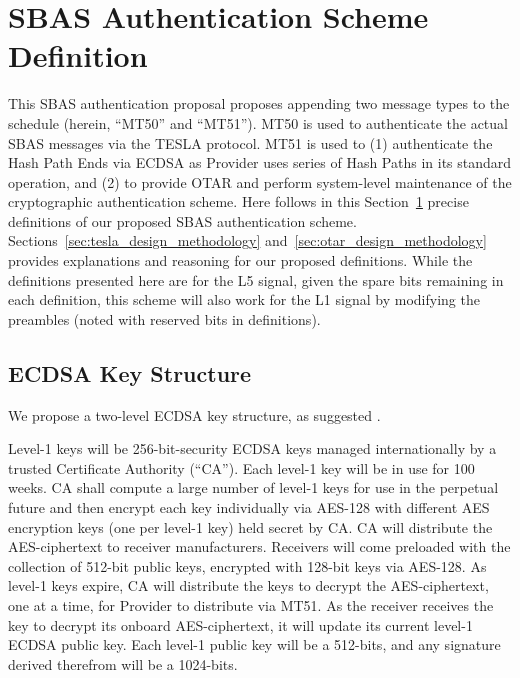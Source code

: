\documentclass[letterpaper,times]{IONconf/IONconf}
\begin{document}
\section{SBAS Authentication Scheme Definition} \label{sec:sbas_authentication_scheme_definition}

	This SBAS authentication proposal proposes appending two message types to the schedule (herein, ``MT50'' and ``MT51'').
	MT50 is used to authenticate the actual SBAS messages via the TESLA protocol.
	MT51 is used to (1) authenticate the Hash Path Ends via ECDSA as Provider uses series of Hash Paths in its standard operation, and (2) to provide OTAR and perform system-level maintenance of the cryptographic authentication scheme.
	Here follows in this Section~\ref{sec:sbas_authentication_scheme_definition} precise definitions of our proposed SBAS authentication scheme.
	Sections~\ref{sec:tesla_design_methodology} and~\ref{sec:otar_design_methodology} provides explanations and reasoning for our proposed definitions.
	While the definitions presented here are for the L5 signal, given the spare bits remaining in each definition, this scheme will also work for the L1 signal by modifying the preambles (noted with reserved bits in definitions).

	\subsection{ECDSA Key Structure} \label{sub:ecdsa_key_structure}

		We propose a two-level ECDSA key structure, as suggested \cite{Neish_Dissertation}.

		Level-1 keys will be 256-bit-security ECDSA keys managed internationally by a trusted Certificate Authority (``CA'').
		Each level-1 key will be in use for 100 weeks.
		CA shall compute a large number of level-1 keys for use in the perpetual future and then encrypt each key individually via AES-128 with different AES encryption keys (one per level-1 key) held secret by CA.
		CA will distribute the AES-ciphertext to receiver manufacturers.
		Receivers will come preloaded with the collection of 512-bit public keys, encrypted with 128-bit keys via AES-128.
		As level-1 keys expire, CA will distribute the keys to decrypt the AES-ciphertext, one at a time, for Provider to distribute via MT51.
		As the receiver receives the key to decrypt its onboard AES-ciphertext, it will update its current level-1 ECDSA public key.
		Each level-1 public key will be a 512-bits, and any signature derived therefrom will be a 1024-bits.
\end{document}
